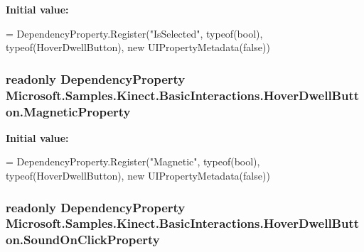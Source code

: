 {\bfseries Initial value\-:}
\begin{DoxyCode}
=
            DependencyProperty.Register(\textcolor{stringliteral}{"IsSelected"}, typeof(\textcolor{keywordtype}{bool}), typeof(HoverDwellButton), \textcolor{keyword}{new} 
      UIPropertyMetadata(\textcolor{keyword}{false}))
\end{DoxyCode}
\hypertarget{class_microsoft_1_1_samples_1_1_kinect_1_1_basic_interactions_1_1_hover_dwell_button_add68affd3658ae57aacb6bdd6e200af4}{
\subsubsection[{Magnetic\-Property}]{\setlength{\rightskip}{0pt plus 5cm}readonly Dependency\-Property Microsoft.\-Samples.\-Kinect.\-Basic\-Interactions.\-Hover\-Dwell\-Button.\-Magnetic\-Property\hspace{0.3cm}{\ttfamily [static]}}}\label{class_microsoft_1_1_samples_1_1_kinect_1_1_basic_interactions_1_1_hover_dwell_button_add68affd3658ae57aacb6bdd6e200af4}
{\bfseries Initial value\-:}
\begin{DoxyCode}
=
            DependencyProperty.Register(\textcolor{stringliteral}{"Magnetic"}, typeof(\textcolor{keywordtype}{bool}), typeof(HoverDwellButton), \textcolor{keyword}{new} 
      UIPropertyMetadata(\textcolor{keyword}{false}))
\end{DoxyCode}
\hypertarget{class_microsoft_1_1_samples_1_1_kinect_1_1_basic_interactions_1_1_hover_dwell_button_a5c96459d289349d2f5996a181129cf7f}{
\subsubsection[{Sound\-On\-Click\-Property}]{\setlength{\rightskip}{0pt plus 5cm}readonly Dependency\-Property Microsoft.\-Samples.\-Kinect.\-Basic\-Interactions.\-Hover\-Dwell\-Button.\-Sound\-On\-Click\-Property\hspace{0.3cm}{\ttfamily [static]}}}\label{class_microsoft_1_1_samples_1_1_kinect_1_1_basic_interactions_1_1_hover_dwell_button_a5c96459d289349d2f5996a181129cf7f}
